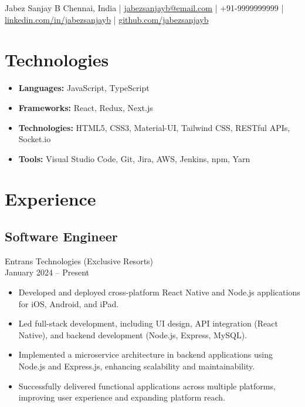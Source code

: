 \documentclass[10pt, letterpaper]{article}
\begin{document}
    \newcommand{\AND}{\unskip
        \cleaders\copy\ANDbox\hskip\wd\ANDbox
        \ignorespaces
    }
    \newsavebox\ANDbox
    \sbox\ANDbox{$|$}

    \begin{center}
        \fontsize{25pt}{25pt}\selectfont Jabez Sanjay B
        \vspace{5pt}
        \normalsize
        Chennai, India | \href{mailto:jabezsanjayb@email.com}{jabezsanjayb@email.com} | +91-9999999999 | \href{https://linkedin.com/in/jabezsanjayb}{linkedin.com/in/jabezsanjayb} | \href{https://github.com/jabezsanjayb}{github.com/jabezsanjayb} 
    \end{center}
    \vspace{5pt - 0.3cm}

    \section{Technologies}
        \begin{itemize}[leftmargin=*]
            \item \textbf{Languages:} JavaScript, TypeScript
            \item \textbf{Frameworks:} React, Redux, Next.js
            \item \textbf{Technologies:} HTML5, CSS3, Material-UI, Tailwind CSS, RESTful APIs, Socket.io
            \item \textbf{Tools:} Visual Studio Code, Git, Jira, AWS, Jenkins, npm, Yarn
        \end{itemize}

    \section{Experience}
        \subsection{Software Engineer}
            Entrans Technologies (Exclusive Resorts) \\
            January 2024 – Present
            \begin{itemize}[leftmargin=*]
                \item Developed and deployed cross-platform React Native and Node.js applications for iOS, Android, and iPad.
                \item Led full-stack development, including UI design, API integration (React Native), and backend development (Node.js, Express, MySQL).
                \item Implemented a microservice architecture in backend applications using Node.js and Express.js, enhancing scalability and maintainability.
                \item Successfully delivered functional applications across multiple platforms, improving user experience and expanding platform reach.
            \end{itemize}
\end{document}
